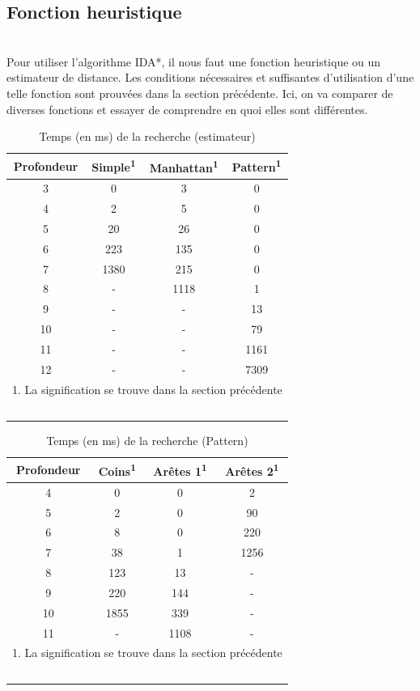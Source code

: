 \documentclass[fleqn,10pt,french]{SelfArx} %
\begin{document}
\subsection{Fonction heuristique}

~\\\indent
Pour utiliser l’algorithme IDA*, il nous faut une fonction heuristique ou un estimateur de distance. Les conditions nécessaires et suffisantes d’utilisation d’une telle fonction sont prouvées dans la section précédente. Ici, on va comparer de diverses fonctions et essayer de comprendre en quoi elles sont différentes.

\begin{table}[htbp]
\centering
\begin{tabular}{cccc}
\hline
\rowcolor{blue!20} \rule{0pt}{12pt} \textbf{Profondeur} & \textbf{Simple\textsuperscript{1} } & \textbf{Manhattan}\textsuperscript{1} & \textbf{Pattern\textsuperscript{1}}\\
\hline
3 & 0 & 3 & 0 \\
4 & 2 & 5 & 0 \\
5 & 20 & 26 & 0 \\
6 & 223 & 135 & 0  \\
7 & 1380 & 215 & 0 \\
8 & - & 1118 & 1 \\
9 & - & - & 13 \\
10 & - & - & 79 \\
11 & - & - & 1161 \\
12 & - & - & 7309 \\
\hline
\multicolumn{4}{l}{\small{1. La signification se trouve dans la section précédente}} \\
\hline
~\\
\end{tabular}
\caption{Temps (en ms) de la recherche (estimateur)}
\end{table}

\begin{table}[htbp]
\centering
\begin{tabular}{cccc}
\hline
\rowcolor{blue!20} \rule{0pt}{12pt} \textbf{Profondeur} & \textbf{Coins\textsuperscript{1} } & \textbf{Arêtes 1}\textsuperscript{1} & \textbf{Arêtes 2\textsuperscript{1}}\\
\hline
4 & 0 & 0 & 2 \\
5 & 2 & 0 & 90 \\
6 & 8 & 0 & 220  \\
7 & 38 & 1 & 1256 \\
8 & 123 & 13 & - \\
9 & 220 & 144 & - \\
10 & 1855 & 339 & - \\
11 & - & 1108 & - \\
\hline
\multicolumn{4}{l}{\small{1. La signification se trouve dans la section précédente}} \\
\hline
~\\
\end{tabular}
\caption{Temps (en ms) de la recherche (Pattern)}
\end{table}
\end{document}
